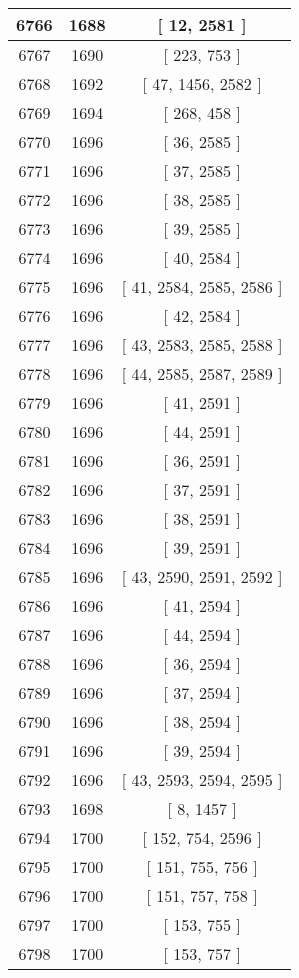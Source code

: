 \begin{center}
\begin{longtable}[H]{|| c c c ||}
\hline
6766 & 1688 & [ 12, 2581 ] \\ 
\hline
6767 & 1690 & [ 223, 753 ] \\ 
\hline
6768 & 1692 & [ 47, 1456, 2582 ] \\ 
\hline
6769 & 1694 & [ 268, 458 ] \\ 
\hline
6770 & 1696 & [ 36, 2585 ] \\ 
\hline
6771 & 1696 & [ 37, 2585 ] \\ 
\hline
6772 & 1696 & [ 38, 2585 ] \\ 
\hline
6773 & 1696 & [ 39, 2585 ] \\ 
\hline
6774 & 1696 & [ 40, 2584 ] \\ 
\hline
6775 & 1696 & [ 41, 2584, 2585, 2586 ] \\ 
\hline
6776 & 1696 & [ 42, 2584 ] \\ 
\hline
6777 & 1696 & [ 43, 2583, 2585, 2588 ] \\ 
\hline
6778 & 1696 & [ 44, 2585, 2587, 2589 ] \\ 
\hline
6779 & 1696 & [ 41, 2591 ] \\ 
\hline
6780 & 1696 & [ 44, 2591 ] \\ 
\hline
6781 & 1696 & [ 36, 2591 ] \\ 
\hline
6782 & 1696 & [ 37, 2591 ] \\ 
\hline
6783 & 1696 & [ 38, 2591 ] \\ 
\hline
6784 & 1696 & [ 39, 2591 ] \\ 
\hline
6785 & 1696 & [ 43, 2590, 2591, 2592 ] \\ 
\hline
6786 & 1696 & [ 41, 2594 ] \\ 
\hline
6787 & 1696 & [ 44, 2594 ] \\ 
\hline
6788 & 1696 & [ 36, 2594 ] \\ 
\hline
6789 & 1696 & [ 37, 2594 ] \\ 
\hline
6790 & 1696 & [ 38, 2594 ] \\ 
\hline
6791 & 1696 & [ 39, 2594 ] \\ 
\hline
6792 & 1696 & [ 43, 2593, 2594, 2595 ] \\ 
\hline
6793 & 1698 & [ 8, 1457 ] \\ 
\hline
6794 & 1700 & [ 152, 754, 2596 ] \\ 
\hline
6795 & 1700 & [ 151, 755, 756 ] \\ 
\hline
6796 & 1700 & [ 151, 757, 758 ] \\ 
\hline
6797 & 1700 & [ 153, 755 ] \\ 
\hline
6798 & 1700 & [ 153, 757 ] \\ 

\end{longtable}
\end{center}
